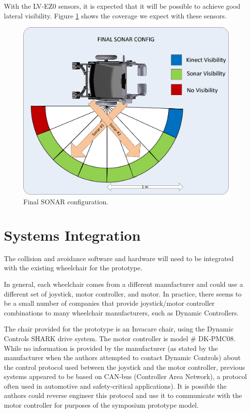 \documentclass[oneside,final,a4paper]{report}
\begin{document}
With the LV-EZ0 sensors, it is expected that it will be possible to achieve good lateral visibility. Figure \ref{sonar_final} shows the coverage we expect with these sensors.

\begin{figure}[hbt]
 \centering
 \includegraphics[scale=0.6]{SONAR_Config_Final.png}
 \caption{Final SONAR configuration.}
 \label{sonar_final}
\end{figure}


\section{Systems Integration}
The collision and avoidance software and hardware will need to be integrated with the existing wheelchair for the prototype.

In general, each wheelchair comes from a different manufacturer and could use a different set of joystick, motor controller, and motor. In practice, there seems to be a small number of companies that provide joystick/motor controller combinations to many wheelchair manufacturers, such as Dynamic Controllers.

The chair provided for the prototype is an Invacare chair, using the Dynamic Controls SHARK drive system. The motor controller is model \# DK-PMC08. While no information is provided by the manufacturer (as stated by the manufacturer when the authors attempted to contact Dynamic Controls) about the control protocol used between the joystick and the motor controller, previous systems appeared to be based on CAN-bus (Controller Area Network), a protocol often used in automotive and safety-critical applications). It is possible the authors could reverse engineer this protocol and use it to communicate with the motor controller for purposes of the symposium prototype model.
\end{document}
